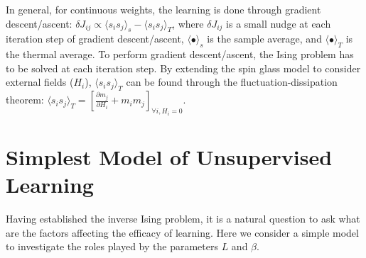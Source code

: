 \documentclass[%
 reprint,
 amsmath,amssymb,
 aps,
]{revtex4-2}
\begin{document}
In general, for continuous weights, the learning is done through gradient descent/ascent:
$    \delta J_{ij} \propto \langle s_i s_j \rangle_s - \langle s_i s_j \rangle_T $, 
where $\delta J_{ij}$ is a small nudge at each iteration step of gradient descent/ascent, $\langle \bullet \rangle_s$ is the sample average, and $\langle \bullet \rangle_T$ is the thermal average. To perform gradient descent/ascent, the Ising problem has to be solved at each iteration step. By extending the spin glass model to consider external fields ($H_i$), $\langle s_i s_j \rangle_T$ can be found through the fluctuation-dissipation theorem:
$\langle s_i s_j \rangle_T = \left[\frac{\partial m_j}{\partial H_i} + m_i m_j \right]_{\forall i, H_i=0} $.

\section{Simplest Model of Unsupervised Learning}

Having established the inverse Ising problem, it is a natural question to ask what are the factors affecting the efficacy of learning. Here we consider a simple model to investigate the roles played by the parameters $L$ and $\beta$. 
\end{document}
